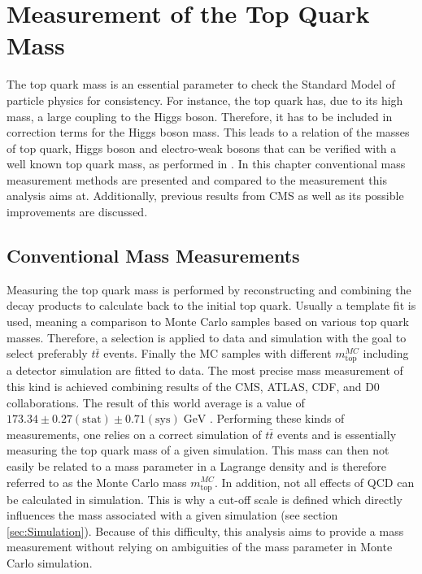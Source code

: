 \chapter{Measurement of the Top Quark Mass}
\label{ch:Measure}
	The top quark mass is an essential parameter to check the Standard Model of particle physics for consistency. For instance, the top quark has, due to its high mass, a large coupling to the Higgs boson. Therefore, it has to be included in correction terms for the Higgs boson mass. This leads to a relation of the masses of top quark, Higgs boson and electro-weak bosons that can be verified with a well known top quark mass, as performed in \cite{ewfit}. In this chapter conventional mass measurement methods are presented and compared to the measurement this analysis aims at. Additionally, previous results from CMS as well as its possible improvements are discussed. 
	
\section{Conventional Mass Measurements}
	Measuring the top quark mass is performed by reconstructing and combining the decay products to calculate back to the initial top quark. Usually a template  fit is used, meaning a comparison to Monte Carlo samples based on various top quark masses. Therefore, a selection is applied to data and simulation with the goal to select preferably $t\bar{t}$ events. Finally the MC samples with different $m_\text{top}^{MC}$ including a detector simulation are fitted to data. The most precise mass measurement of this kind is achieved combining results of the CMS, ATLAS, CDF, and D0 collaborations. The result of this world average is a value of $173.34 \pm 0.27 (\text{stat}) \pm 0.71 (\text{sys})\;\text{GeV}$ \cite{topmass_combination}. Performing these kinds of measurements, one relies on a correct simulation of $t\bar{t}$ events and is essentially measuring the top quark mass of a given simulation. This mass can then not easily be related to a mass parameter in a Lagrange density and is therefore referred to as the Monte Carlo mass $m_\text{top}^{MC}$. In addition, not all effects of QCD can be calculated \cite{nonperturbative} in simulation. This is why a cut-off \cite{cutoff} scale is defined which directly influences the mass associated with a given simulation (see section \ref{sec:Simulation}). Because of this difficulty, this analysis aims to provide a mass measurement without relying on ambiguities of the mass parameter in Monte Carlo simulation.

